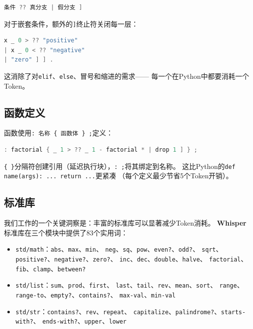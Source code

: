 \documentclass[11pt,a4paper]{ctexart}
\begin{document}
\begin{lstlisting}[language=C,basicstyle=\ttfamily\small]
条件 ?? 真分支 | 假分支 ]
\end{lstlisting}

对于嵌套条件，额外的\texttt{]}终止符关闭每一层：

\begin{lstlisting}[language=C,basicstyle=\ttfamily\small]
x _ 0 > ?? "positive"
| x _ 0 < ?? "negative"
| "zero" ] ] .
\end{lstlisting}

这消除了对\texttt{elif}、\texttt{else}、冒号和缩进的需求——
每一个在Python中都要消耗一个Token。

\subsection{函数定义}

函数使用\texttt{: 名称 \{ 函数体 \} ;}定义：

\begin{lstlisting}[language=C,basicstyle=\ttfamily\small]
: factorial { _ 1 > ?? _ 1 - factorial * | drop 1 ] } ;
\end{lstlisting}

\texttt{\{ \}}分隔符创建引用（延迟执行块），\texttt{: ;}将其绑定到名称。
这比Python的\texttt{def name(args): ... return ...}更紧凑
（每个定义最少节省5个Token开销）。

\subsection{标准库}

我们工作的一个关键洞察是：丰富的标准库可以显著减少Token消耗。
\textbf{Whisper}标准库在三个模块中提供了83个实用词：

\begin{itemize}
\item \texttt{std/math}：\texttt{abs}、\texttt{max}、\texttt{min}、
  \texttt{neg}、\texttt{sq}、\texttt{pow}、\texttt{even?}、\texttt{odd?}、
  \texttt{sqrt}、\texttt{positive?}、\texttt{negative?}、\texttt{zero?}、
  \texttt{inc}、\texttt{dec}、\texttt{double}、\texttt{halve}、
  \texttt{factorial}、\texttt{fib}、\texttt{clamp}、\texttt{between?}
\item \texttt{std/list}：\texttt{sum}、\texttt{prod}、\texttt{first}、
  \texttt{last}、\texttt{tail}、\texttt{rev}、\texttt{mean}、\texttt{sort}、
  \texttt{range}、\texttt{range-to}、\texttt{empty?}、\texttt{contains?}、
  \texttt{max-val}、\texttt{min-val}
\item \texttt{std/str}：\texttt{contains?}、\texttt{rev}、\texttt{repeat}、
  \texttt{capitalize}、\texttt{palindrome?}、\texttt{starts-with?}、
  \texttt{ends-with?}、\texttt{upper}、\texttt{lower}
\end{itemize}
\end{document}
